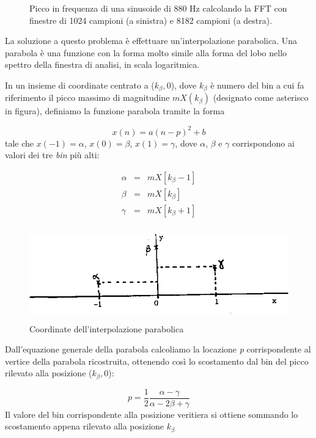 \documentclass[12pt]{report}
\begin{document}
\begin{figure}[htbp]
\begin{minipage}[c]{.40\textwidth}
	\end{minipage} 
	\caption{Picco in frequenza di una sinusoide di 880 Hz calcolando la FFT con finestre di 1024 campioni (a sinistra) e 8182 campioni (a destra).}
	\label{fig:peak}
\end{figure} 

La soluzione a questo problema è effettuare un'interpolazione parabolica\cite{parshl}. Una parabola è una funzione con la forma molto simile alla forma del lobo nello spettro della finestra di analisi, in scala logaritmica.

In un insieme di coordinate centrato a ($k_\beta,0$), dove $k_\beta$ è numero del bin a cui fa riferimento il picco massimo di magnitudine $mX(k_\beta)$ (designato come asterisco in figura), definiamo la funzione parabola tramite la forma

$$ x(n) = a(n - p)^2 + b $$
tale che $x(-1) = \alpha$, $x(0) = \beta$, $x(1) = \gamma$, dove $\alpha$, $\beta$ e $\gamma$ corrispondono ai valori dei tre {\itshape bin} più alti:

\begin{eqnarray*}
	\alpha & = & mX[k_\beta - 1] \\
	\beta & = & mX[k_\beta] \\
	\gamma & = & mX[k_\beta + 1]
\end{eqnarray*}

\begin{figure}[htbp]
\centerline{\includegraphics[height=40mm]{img/parab}}
\caption{Coordinate dell'interpolazione parabolica}
\label{fig:parab}
\end{figure}
Dall'equazione generale della parabola calcoliamo la locazione {\itshape p} corrispondente al vertice della parabola ricostruita, ottenendo così lo scostamento dal bin del picco rilevato alla posizione ($k_\beta, 0$):

$$ p = \frac{1}{2} \frac{\alpha - \gamma}{\alpha - 2\beta + \gamma} $$
Il valore del bin corrispondente alla posizione veritiera si ottiene sommando lo scostamento appena rilevato alla posizione $k_\beta$
\end{document}
